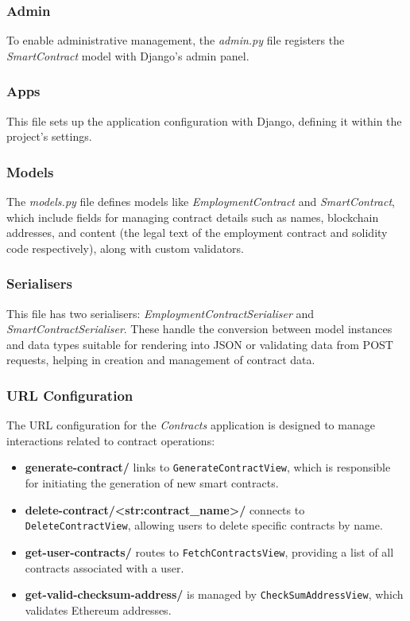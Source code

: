 \subsubsection{Admin} 

To enable administrative management, the \textit{admin.py} file registers the \textit{SmartContract} model with Django's admin panel.

\subsubsection{Apps} 

This file sets up the application configuration with Django, defining it within the project's settings.

\subsubsection{Models} 

The \textit{models.py} file defines models like \textit{EmploymentContract} and \textit{SmartContract}, which include fields for managing contract details such as names, blockchain addresses, and content (the legal text of the employment contract and solidity code respectively), along with custom validators.

\subsubsection{Serialisers}

This file has two serialisers: \textit{EmploymentContractSerialiser} and \textit{SmartContractSerialiser}. These handle the conversion between model instances and data types suitable for rendering into JSON or validating data from POST requests, helping in creation and management of contract data.

\subsubsection{URL Configuration}

The URL configuration for the \textit{Contracts} application is designed to manage interactions related to contract operations:

\begin{itemize}
    \item \textbf{generate-contract/} links to \texttt{GenerateContractView}, which is responsible for initiating the generation of new smart contracts.
    \item \textbf{delete-contract/<str:contract\_name>/} connects to \texttt{DeleteContractView}, allowing users to delete specific contracts by name.
    \item \textbf{get-user-contracts/} routes to \texttt{FetchContractsView}, providing a list of all contracts associated with a user.
    \item \textbf{get-valid-checksum-address/} is managed by \texttt{CheckSumAddressView}, which validates Ethereum addresses.
\end{itemize}

